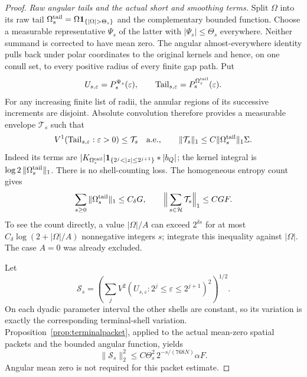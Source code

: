 \documentclass[11pt]{article}
\numberwithin{equation}{section}
\theoremstyle{remark}
\theoremstyle{definition}
\begin{document}
\begin{proof}
\smallskip
\noindent\emph{Raw angular tails and the actual short and smoothing terms.}
Split $\Omega$ into its raw tail
$\Omega_s^{\rm tail}=\Omega\mathbf1_{\{|\Omega|>\Theta_s\}}$
and the complementary bounded function.  Choose a measurable
representative $\Psi_s$ of the latter with $|\Psi_s|\le\Theta_s$
everywhere.  Neither summand is corrected to have mean zero.
The angular almost-everywhere identity pulls back under polar coordinates
to the original kernels and hence, on one conull set, to every positive
radius of every finite gap path.  Put
\begin{equation}\label{eq:nonosc-bounded-path}
 U_{s,\varepsilon}=P_s^{\Psi_s}(\varepsilon),\qquad
 \mathrm{Tail}_{s,\varepsilon}=P_s^{\Omega_s^{\rm tail}}(\varepsilon).
\end{equation}
For any increasing finite list of radii, the annular regions of its
successive increments are disjoint.  Absolute convolution therefore
provides a measurable envelope $\mathcal T_s$ such that
\begin{equation}\label{eq:nonosc-angular-tail-V1}
 V^1(\mathrm{Tail}_{s,\varepsilon}:\varepsilon>0)
 \le\mathcal T_s\quad\hbox{a.e.},\qquad
 \|\mathcal T_s\|_1
 \le C\|\Omega_s^{\rm tail}\|_1\Sigma.
\end{equation}
Indeed its terms are
$|K_{\Omega_s^{\rm tail}}|\mathbf1_{\{2^j<|z|\le2^{j+1}\}}*|b_Q|$;
the kernel integral is $\log2\,\|\Omega_s^{\rm tail}\|_1$.
There is no shell-counting loss.  The homogeneous entropy count gives
\[
 \sum_{s\ge0}\|\Omega_s^{\rm tail}\|_1\le C_\delta G,
 \qquad \Big\|\sum_{s\in\mathcal H}\mathcal T_s\Big\|_1\le CGF.
\]
To see the count directly, a value $|\Omega|/A$ can exceed
$2^{\delta s}$ for at most
$C_\delta\log(2+|\Omega|/A)$ nonnegative integers $s$; integrate this
inequality against $|\Omega|$.  The case $A=0$ was already excluded.

Let
\[
 \mathcal S_s=
 \left(\sum_jV^2(U_{s,\varepsilon}:
                  2^j\le\varepsilon\le2^{j+1})^2\right)^{1/2}.
\]
On each dyadic parameter interval the other shells are constant, so its
variation is exactly the corresponding terminal-shell variation.
Proposition~\ref{prop:terminalpacket}, applied to the actual mean-zero
spatial packets and the bounded angular function, yields
\begin{equation}\label{eq:nonoscshort}
 \|\mathcal S_s\|_2^2
 \le C\Theta_s^2\,2^{-s/(768N)}\alpha F.
\end{equation}
Angular mean zero is not required for this packet estimate.


\end{proof}
\end{document}
